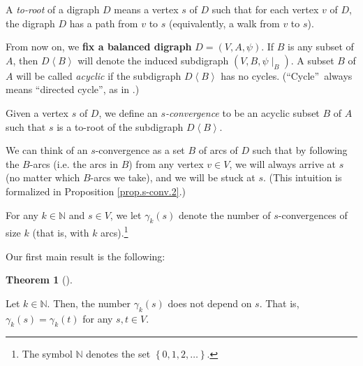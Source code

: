 \documentclass[numbers=enddot,12pt,final,onecolumn,notitlepage]{scrartcl}%
\theoremstyle{definition}
\newtheorem{theo}{Theorem}[section]
\newenvironment{theorem}[1][]
{\begin{theo}[#1]\begin{leftbar}}
{\end{leftbar}\end{theo}}
\theoremstyle{plainsl}
\begin{document}
A \emph{to-root} of a digraph $D$ means a vertex $s$ of $D$ such that for each
vertex $v$ of $D$, the digraph $D$ has a path from $v$ to $s$ (equivalently, a
walk from $v$ to $s$).

From now on, we \textbf{fix a balanced digraph} $D=(V,A,\psi)$. If $B$ is any
subset of $A$, then $D\left\langle B\right\rangle $ will denote the induced
subdigraph $\left(  V,B,\psi\mid_{B}\right)  $. A subset $B$ of $A$ will be
called \emph{acyclic} if the subdigraph $D\left\langle B\right\rangle $ has no
cycles. (\textquotedblleft Cycle\textquotedblright\ always means
\textquotedblleft directed cycle\textquotedblright, as in \cite[Definition
4.5.1]{22s}.)

Given a vertex $s$ of $D$, we define an \emph{$s$-convergence} to be an
acyclic subset $B$ of $A$ such that $s$ is a to-root of the subdigraph $D
\left\langle B \right\rangle $.

We can think of an $s$-convergence as a set $B$ of arcs of $D$ such that by
following the $B$-arcs (i.e. the arcs in $B$) from any vertex $v\in V$, we
will always arrive at $s$ (no matter which $B$-arcs we take), and we will be
stuck at $s$. (This intuition is formalized in Proposition \ref{prop.s-conv.2}.)

For any $k\in\mathbb{N}$ and $s\in V$, we let $\gamma_{k}\left(  s\right)  $
denote the number of $s$-convergences of size $k$ (that is, with $k$
arcs).\footnote{The symbol $\mathbb{N}$ denotes the set $\left\{
0,1,2,\ldots\right\}  $.}

Our first main result is the following:

\begin{theorem}
\label{thm.balgamma}Let $k\in\mathbb{N}$. Then, the number $\gamma_{k}\left(
s\right)  $ does not depend on $s$. That is, $\gamma_{k}\left(  s\right)
=\gamma_{k}\left(  t\right)  $ for any $s,t\in V$.
\end{theorem}
\end{document}
